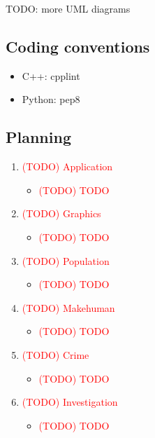 \documentclass[a4paper, twoside]{article}
\begin{document}
TODO: more UML diagrams

\newpage

\subsection{Coding conventions}

\begin{itemize}
	\item{} C++: cpplint
	\item{} Python: pep8
\end{itemize}

\newpage

\subsection{Planning}

\begin{enumerate}
	\item{} \textcolor{red}{(TODO) Application} \begin{itemize}
		\item{} \textcolor{red}{(TODO) TODO}
	\end{itemize}
	\item{} \textcolor{red}{(TODO) Graphics} \begin{itemize}
		\item{} \textcolor{red}{(TODO) TODO}
	\end{itemize}
	\item{} \textcolor{red}{(TODO) Population} \begin{itemize}
		\item{} \textcolor{red}{(TODO) TODO}
	\end{itemize}
	\item{} \textcolor{red}{(TODO) Makehuman} \begin{itemize}
		\item{} \textcolor{red}{(TODO) TODO}
	\end{itemize}
	\item{} \textcolor{red}{(TODO) Crime} \begin{itemize}
		\item{} \textcolor{red}{(TODO) TODO}
	\end{itemize}
	\item{} \textcolor{red}{(TODO) Investigation} \begin{itemize}
		\item{} \textcolor{red}{(TODO) TODO}
	\end{itemize}
\end{enumerate}
\end{document}
